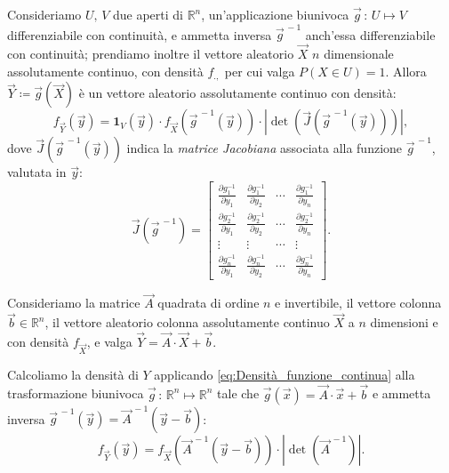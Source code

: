         \begin{prty}\label{prty:Densità_funzione_continua}
            Consideriamo $U,\,V$ due aperti di $\mathbb{R}^n$, 
            un'applicazione biunivoca $\vec{g}\,:\, U \mapsto V$ differenziabile con continuità, 
            e ammetta inversa $\vec{g}^{\,-1}$ anch'essa differenziabile con continuità; 
            prendiamo inoltre il vettore aleatorio $\vec{X}$ $n$ \nbdash dimensionale assolutamente continuo, 
            con densità $f_{.,}$ per cui valga $P(X \in U) = 1$. Allora $\vec{Y} \coloneqq \vec{g}(\vec{X})$ è un
            vettore aleatorio assolutamente continuo con densità:
            \begin{equation}\label{eq:Densità_funzione_continua}
                f_{\vec{Y}}(\vec{y}) = \mathbf{1}_{V}(\vec{y}) \cdot 
                f_{\vec{X}}\left(\vec{g}^{\,-1}(\vec{y})\right) \cdot 
                \left|\det\left(\vec{J}\left(\vec{g}^{\,-1}(\vec{y})\right)\right)\right|
            ,\end{equation}
            dove $\vec{J}(\vec{g}^{\,-1}(\vec{y}))$ indica la \emph{matrice Jacobiana} associata alla 
            funzione $\vec{g}^{\,-1}$, valutata in $\vec{y}$: \[
                \vec{J}(\vec{g}^{\,-1}) = \begin{bmatrix}
                    \frac{\partial g_1^{-1}}{\partial y_1} & \frac{\partial g_1^{-1}}{\partial y_2} & \cdots & \frac{\partial g_1^{-1}}{\partial y_n}\\
                    \frac{\partial g_2^{-1}}{\partial y_1} & \frac{\partial g_2^{-1}}{\partial y_2} & \cdots & \frac{\partial g_2^{-1}}{\partial y_n}\\
                    \vdots & \vdots & \cdots & \vdots\\
                    \frac{\partial g_n^{-1}}{\partial y_1} & \frac{\partial g_n^{-1}}{\partial y_2} & \cdots & \frac{\partial g_n^{-1}}{\partial y_n}
                \end{bmatrix}
            .\]
        \end{prty}
        \begin{defn}
            Consideriamo la matrice $\vec{A}$ quadrata di ordine $n$ e invertibile, 
            il vettore colonna $\vec{b} \in \mathbb{R}^n$, il vettore aleatorio colonna assolutamente 
            continuo $\vec{X}$ a $n$ dimensioni e con densità $f_{\vec{X}}$, e valga 
            $\vec{Y} = \vec{A} \cdot \vec{X} + \vec{b}$.

            Calcoliamo la densità di $Y$ applicando \eqref{eq:Densità_funzione_continua} alla trasformazione 
            biunivoca $\vec{g}\,:\, \mathbb{R}^n \mapsto \mathbb{R}^n$ tale che $\vec{g}(\vec{x}) = \vec{A} \cdot \vec{x} + \vec{b}$ e ammetta inversa $\vec{g}^{\,-1}(\vec{y}) = \vec{A}^{\,-1}(\vec{y} - \vec{b})$:
            \begin{equation}\label{eq:Trasformazioni_vettori_continui}
                f_{\vec{Y}}(\vec{y}) = f_{\vec{X}}\left(\vec{A}^{\,-1}(\vec{y} - \vec{b})\right) \cdot 
                \left|\det(\vec{A}^{\,-1})\right|
            .\end{equation}
        \end{defn}
